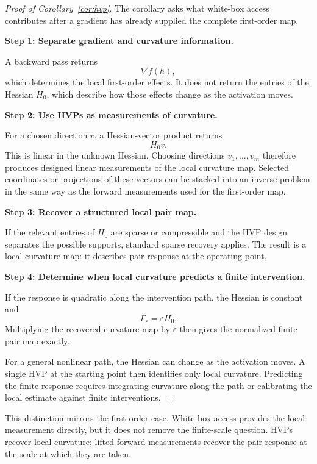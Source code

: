 \documentclass[sigconf,10pt,nonacm,balance=false]{acmart}
\newcommand{\eps}{\varepsilon}
\begin{document}
\begin{proof}[Proof of Corollary~\ref{cor:hvp}]
The corollary asks what white-box access contributes after a gradient has already supplied the complete first-order map.

\noindent\textbf{Step 1: Separate gradient and curvature information.}\par
A backward pass returns
\[
    \nabla f(h),
\]
which determines the local first-order effects. It does not return the entries of the Hessian $H_0$, which describe how those effects change as the activation moves.

\noindent\textbf{Step 2: Use HVPs as measurements of curvature.}\par
For a chosen direction $v$, a Hessian-vector product returns
\[
    H_0v.
\]
This is linear in the unknown Hessian. Choosing directions $v_1,\ldots,v_m$ therefore produces designed linear measurements of the local curvature map. Selected coordinates or projections of these vectors can be stacked into an inverse problem in the same way as the forward measurements used for the first-order map.

\noindent\textbf{Step 3: Recover a structured local pair map.}\par
If the relevant entries of $H_0$ are sparse or compressible and the HVP design separates the possible supports, standard sparse recovery applies. The result is a local curvature map: it describes pair response at the operating point.

\noindent\textbf{Step 4: Determine when local curvature predicts a finite intervention.}\par
If the response is quadratic along the intervention path, the Hessian is constant and
\[
    \Gamma_\eps=\eps H_0.
\]
Multiplying the recovered curvature map by $\eps$ then gives the normalized finite pair map exactly.

For a general nonlinear path, the Hessian can change as the activation moves. A single HVP at the starting point then identifies only local curvature. Predicting the finite response requires integrating curvature along the path or calibrating the local estimate against finite interventions.
\end{proof}

This distinction mirrors the first-order case. White-box access provides the local measurement directly, but it does not remove the finite-scale question. HVPs recover local curvature; lifted forward measurements recover the pair response at the scale at which they are taken.
\end{document}
